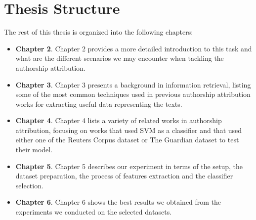 \section{Thesis Structure}
The rest of this thesis is organized into the following chapters:
\begin{itemize}
	\item \textbf{Chapter 2}. Chapter 2 provides a more detailed introduction to this task and what are the different scenarios we may encounter when tackling the authorship attribution.
	\item \textbf{Chapter 3}. Chapter 3 presents a background in information retrieval, listing some of the most common techniques used in previous authorship attribution works for extracting useful data representing the texts.
	\item \textbf{Chapter 4}. Chapter 4 lists a variety of related works in authorship attribution, focusing on works that used SVM as a classifier and that used either one of the Reuters Corpus dataset or The Guardian dataset to test their model.
	\item \textbf{Chapter 5}. Chapter 5 describes our experiment in terms of the setup, the dataset preparation, the process of features extraction and the classifier selection.
	\item \textbf{Chapter 6}. Chapter 6 shows the best results we obtained from the experiments we conducted on the selected datasets.
\end{itemize}
